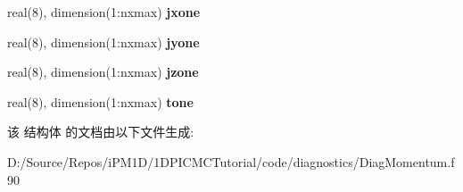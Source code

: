 \begin{DoxyCompactItemize}
real(8), dimension(1\+:nxmax) {\bfseries jxone}
\item 
\mbox{\label{structdiagnosticsmomentum_1_1particlemomentumone_ad23f93f4935d0f94ead95eb03e9b1b6b}} 
real(8), dimension(1\+:nxmax) {\bfseries jyone}
\item 
\mbox{\label{structdiagnosticsmomentum_1_1particlemomentumone_ab84a6ec223ec952c904a982aa8feeb34}} 
real(8), dimension(1\+:nxmax) {\bfseries jzone}
\item 
\mbox{\label{structdiagnosticsmomentum_1_1particlemomentumone_a8475c95307dc35ea3f68d48adc001a69}} 
real(8), dimension(1\+:nxmax) {\bfseries tone}
\end{DoxyCompactItemize}


该 结构体 的文档由以下文件生成\+:\begin{DoxyCompactItemize}
\item 
D\+:/\+Source/\+Repos/i\+P\+M1\+D/1\+D\+P\+I\+C\+M\+C\+Tutorial/code/diagnostics/Diag\+Momentum.\+f90\end{DoxyCompactItemize}
